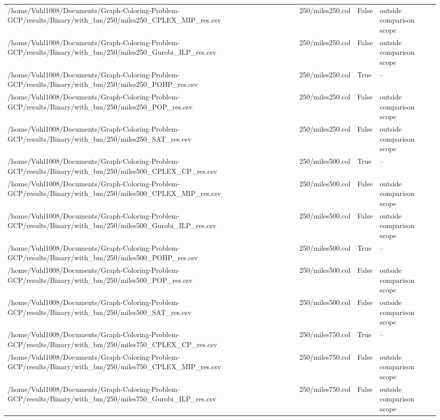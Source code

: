 \begin{table}[htbp]
\begin{tabular}{llll}
/home/Vuhl1008/Documents/Graph-Coloring-Problem-GCP/results/Binary/with\_bm/250/miles250\_CPLEX\_MIP\_res.csv & 250/miles250.col & False & outside comparison scope \\
/home/Vuhl1008/Documents/Graph-Coloring-Problem-GCP/results/Binary/with\_bm/250/miles250\_Gurobi\_ILP\_res.csv & 250/miles250.col & False & outside comparison scope \\
/home/Vuhl1008/Documents/Graph-Coloring-Problem-GCP/results/Binary/with\_bm/250/miles250\_POHP\_res.csv & 250/miles250.col & True & -- \\
/home/Vuhl1008/Documents/Graph-Coloring-Problem-GCP/results/Binary/with\_bm/250/miles250\_POP\_res.csv & 250/miles250.col & False & outside comparison scope \\
/home/Vuhl1008/Documents/Graph-Coloring-Problem-GCP/results/Binary/with\_bm/250/miles250\_SAT\_res.csv & 250/miles250.col & False & outside comparison scope \\
/home/Vuhl1008/Documents/Graph-Coloring-Problem-GCP/results/Binary/with\_bm/250/miles500\_CPLEX\_CP\_res.csv & 250/miles500.col & True & -- \\
/home/Vuhl1008/Documents/Graph-Coloring-Problem-GCP/results/Binary/with\_bm/250/miles500\_CPLEX\_MIP\_res.csv & 250/miles500.col & False & outside comparison scope \\
/home/Vuhl1008/Documents/Graph-Coloring-Problem-GCP/results/Binary/with\_bm/250/miles500\_Gurobi\_ILP\_res.csv & 250/miles500.col & False & outside comparison scope \\
/home/Vuhl1008/Documents/Graph-Coloring-Problem-GCP/results/Binary/with\_bm/250/miles500\_POHP\_res.csv & 250/miles500.col & True & -- \\
/home/Vuhl1008/Documents/Graph-Coloring-Problem-GCP/results/Binary/with\_bm/250/miles500\_POP\_res.csv & 250/miles500.col & False & outside comparison scope \\
/home/Vuhl1008/Documents/Graph-Coloring-Problem-GCP/results/Binary/with\_bm/250/miles500\_SAT\_res.csv & 250/miles500.col & False & outside comparison scope \\
/home/Vuhl1008/Documents/Graph-Coloring-Problem-GCP/results/Binary/with\_bm/250/miles750\_CPLEX\_CP\_res.csv & 250/miles750.col & True & -- \\
/home/Vuhl1008/Documents/Graph-Coloring-Problem-GCP/results/Binary/with\_bm/250/miles750\_CPLEX\_MIP\_res.csv & 250/miles750.col & False & outside comparison scope \\
/home/Vuhl1008/Documents/Graph-Coloring-Problem-GCP/results/Binary/with\_bm/250/miles750\_Gurobi\_ILP\_res.csv & 250/miles750.col & False & outside comparison scope \\

\end{tabular}
\end{table}
